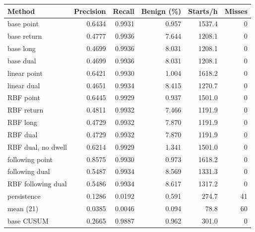 \begin{tabular}{lrrrrr}\toprule
Method & Precision & Recall & Benign (\%) & Starts/h & Misses \\\midrule
base point & 0.6434 & 0.9931 & 0.957 & 1537.4 & 0 \\
base return & 0.4777 & 0.9936 & 7.644 & 1208.1 & 0 \\
base long & 0.4699 & 0.9936 & 8.031 & 1208.1 & 0 \\
base dual & 0.4699 & 0.9936 & 8.031 & 1208.1 & 0 \\
linear point & 0.6421 & 0.9930 & 1.004 & 1618.2 & 0 \\
linear dual & 0.4651 & 0.9934 & 8.415 & 1270.7 & 0 \\
RBF point & 0.6445 & 0.9929 & 0.937 & 1501.0 & 0 \\
RBF return & 0.4811 & 0.9932 & 7.466 & 1191.9 & 0 \\
RBF long & 0.4729 & 0.9932 & 7.870 & 1191.9 & 0 \\
RBF dual & 0.4729 & 0.9932 & 7.870 & 1191.9 & 0 \\
RBF dual, no dwell & 0.6214 & 0.9929 & 1.341 & 1501.0 & 0 \\
following point & 0.8575 & 0.9930 & 0.973 & 1618.2 & 0 \\
following dual & 0.5487 & 0.9934 & 8.569 & 1331.3 & 0 \\
RBF following dual & 0.5486 & 0.9934 & 8.617 & 1317.2 & 0 \\
persistence & 0.1286 & 0.0192 & 0.591 & 274.7 & 41 \\
mean (21) & 0.0385 & 0.0046 & 0.094 & 78.8 & 60 \\
base CUSUM & 0.2665 & 0.9887 & 0.962 & 301.0 & 0 \\
\bottomrule\end{tabular}
